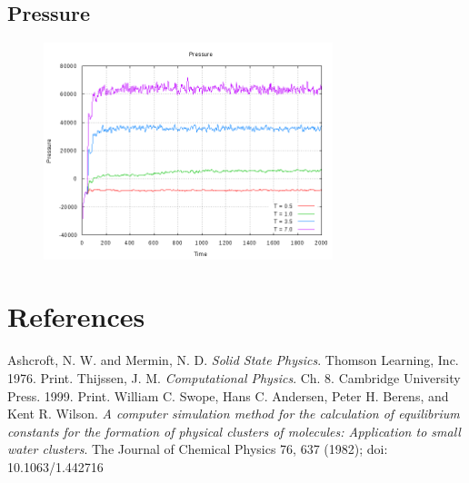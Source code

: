 \documentclass[letterpaper,12pt]{article}
\numberwithin{equation}{subsection}
\begin{document}
\subsection{Pressure}
\begin{figure}[H]
                \centering
                \includegraphics[width=0.75\textwidth]{pressure.png}
\end{figure}

\newpage
\thispagestyle{empty}
\mbox{}

\newpage
\section{References}
\begin{thebibliography}{99}
 Ashcroft, N. W. and Mermin, N. D. \textit{Solid State Physics}. Thomson Learning, Inc. 1976. Print.
 Thijssen, J. M. \textit{Computational Physics}. Ch. 8. Cambridge University Press. 1999. Print.
 William C. Swope, Hans C. Andersen, Peter H. Berens, and Kent R. Wilson. \textit{A computer simulation method for the calculation of equilibrium constants for the formation of physical clusters of molecules: Application to small water clusters}. The Journal of Chemical Physics 76, 637 (1982); doi: 10.1063/1.442716
\end{thebibliography}
\end{document}
